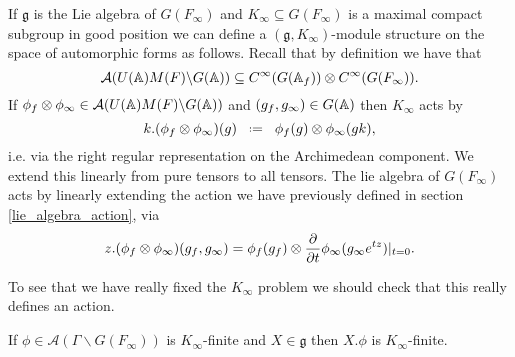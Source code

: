 If \(\mathfrak{g}\) is the Lie algebra of \(G(F_\infty)\) and \(K_\infty\subseteq G(F_\infty)\) is a maximal compact subgroup in good position we can define a \((\mathfrak{g}, K_\infty)\)-module structure on the space of automorphic forms as follows. Recall that by definition we have that 
\[\mathcal{A}(U(\A)M(F)\backslash G(\A)) \subseteq C^\infty(G(\A_f)) \tensor C^\infty(G(F_\infty)).\]
If \(\phi_f\tensor \phi_\infty \in \mathcal{A}(U(\A)M(F)\backslash G(\A)) \) and \((g_f, g_\infty)\in G(\A)\) then \(K_\infty\) acts by 
\[k.(\phi_f\tensor \phi_\infty)(g) \defeq \phi_f(g) \tensor \phi_\infty(gk),\]
i.e. via the right regular representation on the Archimedean component. We extend this linearly from pure tensors to all tensors. The lie algebra of \(G(F_\infty)\) acts by linearly extending the action we have previously defined in section \ref{lie_algebra_action}, via
\[z.(\phi_f\tensor \phi_\infty)(g_f, g_\infty) = \phi_f(g_f)\tensor \Dif{}{t}\phi_\infty(g_\infty e^{tz})|_{t=0}.\] 

To see that we have really fixed the \(K_\infty\) problem we should check that this really defines an action. 

\begin{Lemma}
	If \(\phi\in \mathcal{A}(\Gamma \backslash G(F_\infty))\) is \(K_\infty\)-finite and \(X\in \mathfrak{g}\) then \(X.\phi\) is \(K_\infty\)-finite.
\end{Lemma}

